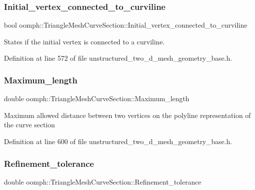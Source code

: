 \subsubsection{\texorpdfstring{Initial\+\_\+vertex\+\_\+connected\+\_\+to\+\_\+curviline}{Initial\_vertex\_connected\_to\_curviline}}
{\footnotesize\ttfamily bool oomph\+::\+Triangle\+Mesh\+Curve\+Section\+::\+Initial\+\_\+vertex\+\_\+connected\+\_\+to\+\_\+curviline\hspace{0.3cm}{\ttfamily [protected]}}



States if the initial vertex is connected to a curviline. 



Definition at line 572 of file unstructured\+\_\+two\+\_\+d\+\_\+mesh\+\_\+geometry\+\_\+base.\+h.

\mbox{\label{classoomph_1_1TriangleMeshCurveSection_a5449b283a0b07ef923253b5fc9e9d024}} 
\subsubsection{\texorpdfstring{Maximum\+\_\+length}{Maximum\_length}}
{\footnotesize\ttfamily double oomph\+::\+Triangle\+Mesh\+Curve\+Section\+::\+Maximum\+\_\+length\hspace{0.3cm}{\ttfamily [private]}}

Maximum allowed distance between two vertices on the polyline representation of the curve section 

Definition at line 600 of file unstructured\+\_\+two\+\_\+d\+\_\+mesh\+\_\+geometry\+\_\+base.\+h.

\mbox{\label{classoomph_1_1TriangleMeshCurveSection_a3e8dad0254ccbc33232d86d4488ab475}} 
\subsubsection{\texorpdfstring{Refinement\+\_\+tolerance}{Refinement\_tolerance}}
{\footnotesize\ttfamily double oomph\+::\+Triangle\+Mesh\+Curve\+Section\+::\+Refinement\+\_\+tolerance\hspace{0.3cm}{\ttfamily [private]}}

